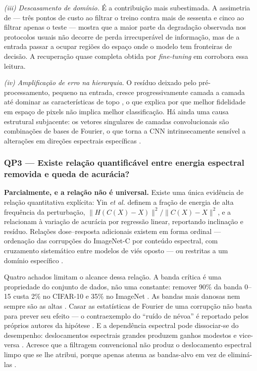 \documentclass[conference]{IEEEtran}
\begin{document}
\emph{(iii) Descasamento de domínio.} É a contribuição mais subestimada. A
assimetria de \cite{b23} --- três pontos de custo ao filtrar o treino contra
mais de sessenta e cinco ao filtrar apenas o teste --- mostra que a maior parte
da degradação observada nos protocolos usuais não decorre de perda
irrecuperável de informação, mas de a entrada passar a ocupar regiões do espaço
onde o modelo tem fronteiras de decisão. A recuperação quase completa obtida
por \textit{fine-tuning} em \cite{b4} corrobora essa leitura.

\emph{(iv) Amplificação de erro na hierarquia.} O resíduo deixado pelo
pré-processamento, pequeno na entrada, cresce progressivamente camada a camada
até dominar as características de topo \cite{b7}, o que explica por que melhor
fidelidade em espaço de pixels não implica melhor classificação. Há ainda uma
causa estrutural subjacente: os vetores singulares de camadas convolucionais
são combinações de bases de Fourier, o que torna a CNN intrinsecamente sensível
a alterações em direções espectrais específicas \cite{b19}.

\subsubsection{QP3 --- Existe relação quantificável entre energia espectral
removida e queda de acurácia?}

\textbf{Parcialmente, e a relação não é universal.} Existe uma única evidência
de relação quantitativa explícita: Yin \textit{et al.} \cite{b18} definem a
fração de energia de alta frequência da perturbação,
$\lVert H(C(X)-X)\rVert^2 / \lVert C(X)-X\rVert^2$, e a relacionam à variação
de acurácia por regressão linear, reportando inclinação e resíduo. Relações
dose--resposta adicionais existem em forma ordinal --- ordenação das corrupções
do ImageNet-C por conteúdo espectral, com cruzamento sistemático entre modelos
de viés oposto \cite{b20} --- ou restritas a um domínio específico \cite{b21}.

Quatro achados limitam o alcance dessa relação. A banda crítica é uma
propriedade do conjunto de dados, não uma constante: remover 90\% da banda
0--15 custa 2\% no CIFAR-10 e 35\% no ImageNet \cite{b22}. As bandas mais
danosas nem sempre são as altas \cite{b19}. Casar as estatísticas de Fourier de
uma corrupção não basta para prever seu efeito --- o contraexemplo do ``ruído
de névoa'' é reportado pelos próprios autores da hipótese \cite{b18}. E a
dependência espectral pode dissociar-se do desempenho: deslocamentos espectrais
grandes produzem ganhos modestos e vice-versa \cite{b24}. Acresce que a
filtragem convencional não produz o deslocamento espectral limpo que se lhe
atribui, porque apenas atenua as bandas-alvo em vez de eliminá-las \cite{b24}.
\end{document}
